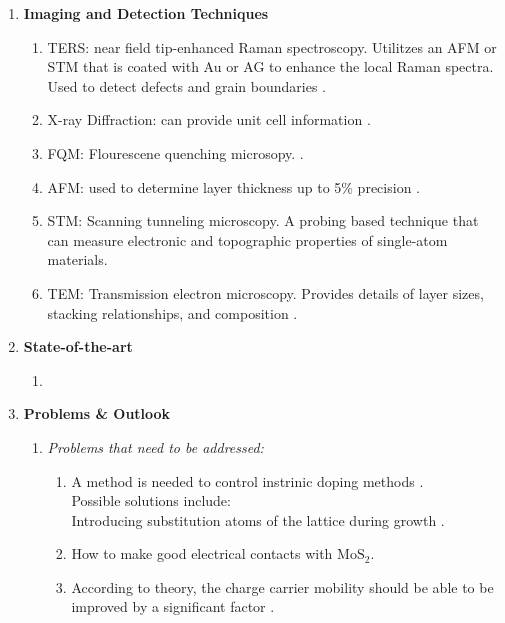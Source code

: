 \documentclass{article}
\begin{document}
\begin{enumerate}
	\item{\textbf{Imaging and Detection Techniques}}
		\begin{enumerate}
			\item{TERS: near field tip-enhanced Raman spectroscopy. Utilitzes an AFM or STM that is coated with Au or AG to enhance the local Raman spectra. Used to detect defects and grain boundaries \cite{acsnanoReview2013}.}
			\item{X-ray Diffraction: can provide unit cell information \cite{acsnanoReview2013}.}
			\item{FQM: Flourescene quenching microsopy. \cite{acsnanoReview2013}.}
			\item{AFM: used to determine layer thickness up to 5\% precision \cite{acsnanoReview2013, Fukuda2008, Osada2011}.}
			\item{STM: Scanning tunneling microscopy. A probing based technique that can measure electronic and topographic properties of single-atom materials. }
			\item{TEM: Transmission electron microscopy. Provides details of layer sizes, stacking relationships, and composition \cite{acsnanoReview2013}.}
		\end{enumerate}


	\item{\textbf{State-of-the-art}}
		\begin{enumerate} %
			\item{}
		\end{enumerate}	%

	\item{\textbf{Problems \& Outlook}}

		\begin{enumerate}	%
			\item{\textit{Problems that need to be addressed:}}
				\begin{enumerate}
					\item{A method is needed to control instrinic doping methods \cite{singleLayerMoS2electronics2015}. \\
					Possible solutions include:\\
					\indent Introducing substitution atoms of the lattice during growth \cite{Dolui2013}.}
					\item{How to make good electrical contacts with $\mathrm{MoS}_2$. \cite{singleLayerMoS2electronics2015}}
					\item{According to theory, the charge carrier mobility should be able to be improved by a significant factor \cite{singleLayerMoS2electronics2015, Kaasbjerg2013}.}
				\end{enumerate}


\end{enumerate}
\end{enumerate}
\end{document}
